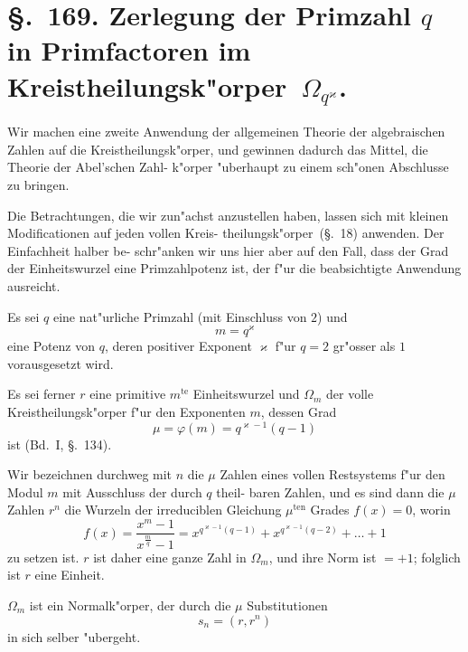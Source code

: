 \documentclass[12pt,a4paper]{article}
\theoremstyle{weber}
\begin{document}
\section*{\S.~169. Zerlegung der Primzahl $q$ in Primfactoren im Kreistheilungsk"orper~$\varOmega_{q^\varkappa}$.}

Wir machen eine zweite Anwendung der allgemeinen Theorie
der algebraischen Zahlen auf die Kreistheilungsk"orper, und
gewinnen dadurch das Mittel, die Theorie der Abel'schen Zahl-
k"orper "uberhaupt zu einem sch"onen Abschlusse zu bringen.

Die Betrachtungen, die wir zun"achst anzustellen haben,
lassen sich mit kleinen Modificationen auf jeden vollen Kreis-
theilungsk"orper~(\S.~18) anwenden. Der Einfachheit halber be-
schr"anken wir uns hier aber auf den Fall, dass der Grad der
Einheitswurzel eine Primzahlpotenz ist, der f"ur die beabsichtigte
Anwendung ausreicht.

Es sei $q$ eine nat"urliche Primzahl (mit Einschluss von $2$) und
\begin{equation}\label{eq:s169-1}
m = q^\varkappa
\end{equation}
eine Potenz von $q$, deren positiver Exponent $\varkappa$ f"ur $q = 2$ gr"osser
als $1$ vorausgesetzt wird.

Es sei ferner $r$ eine primitive $m^{\mathrm{te}}$ Einheitswurzel und $\varOmega_m$ der
volle Kreistheilungsk"orper f"ur den Exponenten $m$, dessen Grad
\begin{equation}\label{eq:s169-2}
\mu = \varphi(m) = q^{\varkappa-1}(q-1)
\end{equation}
ist (Bd.~I, \S.~134).

Wir bezeichnen durchweg mit $n$ die $\mu$ Zahlen eines vollen
Restsystems f"ur den Modul $m$ mit Ausschluss der durch $q$ theil-
baren Zahlen, und es sind dann die $\mu$ Zahlen $r^n$ die Wurzeln
der irreduciblen Gleichung $\mu^{\mathrm{ten}}$ Grades $f(x) = 0$, worin
\begin{equation}\label{eq:s169-3}
f(x) = \frac{x^m - 1}{x^{\frac{m}{q}} - 1} = x^{q^{\varkappa-1}(q-1)} + x^{q^{\varkappa-1}(q-2)} + \dots + 1
\end{equation}
zu setzen ist. $r$ ist daher eine ganze Zahl in $\varOmega_m$, und ihre
Norm ist $= +1$; folglich ist $r$ eine Einheit.

$\varOmega_m$ ist ein Normalk"orper, der durch die $\mu$ Substitutionen
\[
s_n = (r, r^n)
\]
in sich selber "ubergeht.
\end{document}
